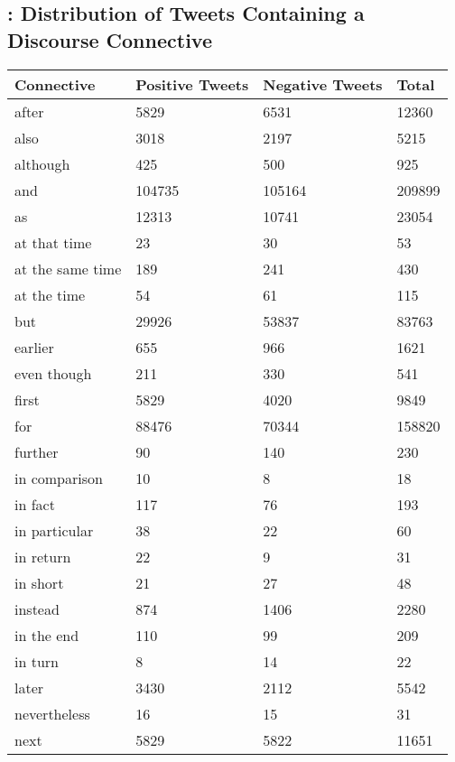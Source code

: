 \documentclass[11pt,letterpaper]{article}
\begin{document}
\begin{figure*}[t]
\begin{appendices}
\centering
\section{: Distribution of Tweets Containing a Discourse Connective}\label{App:AppendixA}
\begin{tabular}{|l|l|l|l|}
\hline
Connective & Positive Tweets & Negative Tweets & Total \\
\hline
after & 5829 & 6531 & 12360 \\
\hline
also & 3018 & 2197 & 5215 \\
\hline
although & 425 & 500 & 925 \\
\hline
and & 104735 & 105164 & 209899 \\
\hline
as & 12313 & 10741 & 23054 \\
\hline
at that time & 23 & 30 & 53 \\
\hline
at the same time & 189 & 241 & 430 \\
\hline
at the time & 54 & 61 & 115 \\
\hline
but & 29926 & 53837 & 83763 \\
\hline
earlier & 655 & 966 & 1621 \\
\hline
even though & 211 & 330 & 541 \\
\hline
first & 5829 & 4020 & 9849 \\
\hline
for & 88476 & 70344 & 158820 \\
\hline
further & 90 & 140 & 230 \\
\hline
in comparison & 10 & 8 & 18 \\
\hline
in fact & 117 & 76 & 193 \\
\hline
in particular & 38 & 22 & 60 \\
\hline
in return & 22 & 9 & 31 \\
\hline
in short & 21 & 27 & 48 \\
\hline
instead & 874 & 1406 & 2280 \\
\hline
in the end & 110 & 99 & 209 \\
\hline
in turn & 8 & 14 & 22 \\
\hline
later & 3430 & 2112 & 5542 \\
\hline
nevertheless & 16 & 15 & 31 \\
\hline
next & 5829 & 5822 & 11651 \\

\end{tabular}
\end{appendices}
\end{figure*}
\end{document}
